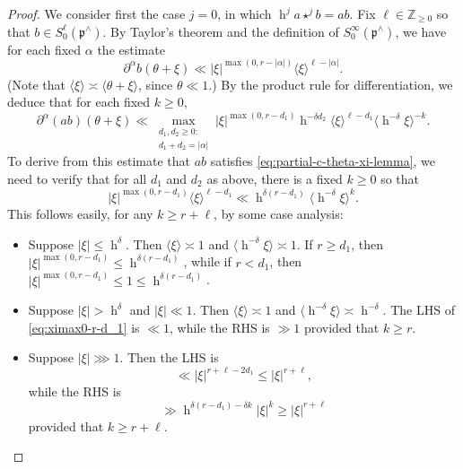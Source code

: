 \documentclass[reqno]{amsart}
\DeclareMathOperator{\h}{h}
\theoremstyle{plain} \newtheorem{theorem} {Theorem}
\theoremstyle{definition} \newtheorem{definition} [theorem] {Definition}
\theoremstyle{itplain} %
\numberwithin{equation}{section}
\numberwithin{theorem}{section}
\renewcommand{\geq}{\geqslant}
\renewcommand{\leq}{\leqslant}
\begin{document}
\begin{proof}
  We consider first the case $j = 0$, in which $\h^j a \star^j b = a b$.  Fix $\ell \in \mathbb{Z}_{\geq 0}$ so that $b \in S^\ell_{0}(\mathfrak{p}^\wedge)$.  By Taylor's theorem and the definition of $S^\infty_0(\mathfrak{p}^\wedge)$, we have for each fixed $\alpha$ the estimate
  \begin{equation*}
    \partial^\alpha b(\theta + \xi ) \ll |\xi|^{\max(0, r - |\alpha|)} \langle \xi  \rangle^{\ell - |\alpha|}.
  \end{equation*}
  (Note that $\langle \xi \rangle \asymp \langle \theta + \xi \rangle$, since $\theta \ll 1$.)  By the product rule for differentiation, we deduce that for each fixed $k \geq 0$,
  \begin{equation*}
    \partial^\alpha (a b)(\theta + \xi) \ll
    \max_{
      \substack{
        d_1, d_2 \geq 0:   \\
        d_1 + d_2 = |\alpha|
      }
    }
    |\xi|^{\max(0,r - d_1)}
    \h^{- \delta d_2}
    \langle \xi  \rangle ^{\ell - d_1}
    \langle \h^{-\delta} \xi  \rangle^{-k}.
  \end{equation*}
  To derive from this estimate that $a b$ satisfies \eqref{eq:partial-c-theta-xi-lemma}, we need to verify that for all $d_1$ and $d_2$ as above, there is a fixed $k \geq 0$ so that
  \begin{equation}\label{eq:ximax0-r-d_1}
    |\xi|^{\max(0,r - d_1)}
    \langle \xi  \rangle ^{\ell - d_1}
    \ll
    \h^{\delta (r - d_1)}
    \langle \h^{- \delta} \xi  \rangle^k.
  \end{equation}
  This follows easily, for any $k \geq r + \ell$, by some case analysis:
  \begin{itemize}
  \item Suppose $|\xi| \leq \h^\delta$.  Then $\langle \xi \rangle \asymp 1$ and $\langle \h^{-\delta} \xi \rangle \asymp 1$.  If $r \geq d_1$, then $|\xi|^{\max(0,r - d_1)} \leq \h^{\delta (r - d_1)}$, while if $r < d_1$, then $|\xi|^{\max(0, r - d_1)} \leq 1 \leq \h^{\delta(r-d_1)}$.
  \item Suppose $|\xi| > \h^\delta$ and $|\xi| \ll 1$.  Then $\langle \xi \rangle \asymp 1$ and $\langle \h^{-\delta} \xi \rangle \asymp \h^{-\delta}$.  The LHS of \eqref{eq:ximax0-r-d_1} is $\ll 1$, while the RHS is $\gg 1$ provided that $k \geq r$.
  \item Suppose $|\xi| \ggg 1$.  Then the LHS is
    \begin{equation*}
      \ll |\xi|^{r + \ell - 2 d_1} \leq |\xi|^{r + \ell},
    \end{equation*}
    while the RHS is
    \begin{equation*}
      \gg \h^{\delta (r - d_1) - \delta k} |\xi|^k
      \geq |\xi|^{r+\ell}
    \end{equation*}
    provided that $k \geq r + \ell$.
  \end{itemize}


\end{proof}
\end{document}
